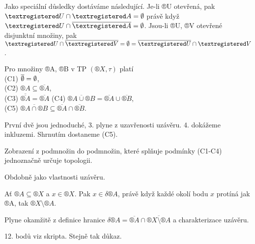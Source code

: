 \documentclass[12pt]{article}					%
\begin{document}
        Jako speciální důsledky dostáváme následující. Je-li ®U otevřená, pak $®U \cap ®A = \O$ právě když $®U \cap \overline{®A} = \O$. Jsou-li ®U, ®V otevřené disjunktní množiny, pak $®U \cap \overline{®V} = \O = \overline{®U} \cap ®V$.

        \begin{tvrzeni}
            Pro množiny ®A, ®B v TP $(®X, \tau)$ platí\\
            (C1) $\overline{\emptyset} = \emptyset$,\\
            (C2) $®A \subseteq \overline{®A}$,\\
            (C3) $\overline{\overline{®A}} = \overline{®A}$
            (C4) $\overline{®A \cup ®B} = \overline{®A} \cup \overline{®B}$,\\
            (C5) $\overline{®A \cap ®B} \subseteq \overline{®A} \cap \overline{®B}$.

            \begin{dukazin}
                První dvě jsou jednoduché, 3. plyne z uzavřenosti uzávěru. 4. dokážeme inkluzemi. Shrnutím dostaneme (C5).
            \end{dukazin}
        \end{tvrzeni}

        \begin{priklad}
                Zobrazení z podmnožin do podmnožin, které splňuje podmínky (C1-C4) jednoznačně určuje topologii.
        \end{priklad}

        \begin{tvrzeni}
            Obdobně jako vlastnosti uzávěru.
        \end{tvrzeni}

        \begin{tvrzeni}
            Ať $®A \subseteq ®X$ a $x \in ®X$. Pak $x \in \delta ®A$, právě když každé okolí bodu $x$ protíná jak ®A, tak $®X \setminus ®A$.
            \begin{dukazin}
                Plyne okamžitě z definice hranice $\delta ®A = \overline{®A} \cap \overline{®X \setminus ®A}$ a charakterizace uzávěru.
            \end{dukazin}
        \end{tvrzeni}

        \begin{tvrzeni}
            12. bodů viz skripta. Stejně tak důkaz.
        \end{tvrzeni}
    
\end{document}
